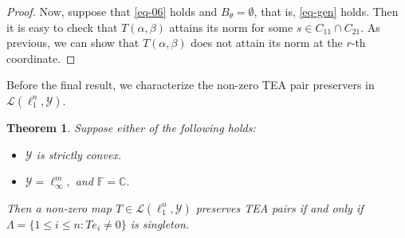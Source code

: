 \documentclass{amsart}
\newtheorem{theorem}{Theorem}[section]
\theoremstyle{definition}
\theoremstyle{remark}
\numberwithin{equation}{section}
\begin{document}
\begin{proof}
Now, suppose that  \eqref{eq-06} holds and  $B_\theta=\emptyset$, that is, \eqref{eq-gen} holds. Then it is easy to check  that $T(\alpha,\beta)$ attains its norm for some $s\in C_{11}\cap C_{21}.$ As previous, we can show that $T(\alpha,\beta)$ does not attain its norm at the $r$-th coordinate.
\end{proof}
Before the final result, we characterize the non-zero TEA pair preservers in  $\mathcal{L}(\ell_1^n,\mathcal{Y}).$ 
\begin{theorem}\label{th-tea}
 Suppose either of the following holds:
\begin{itemize}
	\item $\mathcal{Y}$ is strictly convex. 
	\item $\mathcal{Y}=\ell_\infty^m,$ and $\mathbb{F}=\mathbb{C}.$	
	\end{itemize}  	Then a non-zero map $T\in \mathcal{L}(\ell_1^n,\mathcal{Y})$ preserves TEA pairs if and only if $\Lambda=\{1\leq i\leq n:Te_i\neq 0\}$ is singleton.
\end{theorem}
\end{document}

